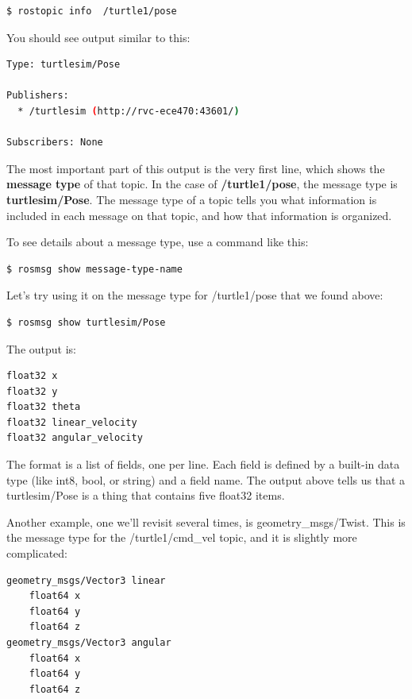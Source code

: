 \begin{enumerate}
\begin{lstlisting}[language=bash]
$ rostopic info  /turtle1/pose
\end{lstlisting}

	You should see output similar to this:

\begin{lstlisting}[language=bash]
Type: turtlesim/Pose

Publishers:
  * /turtlesim (http://rvc-ece470:43601/)

Subscribers: None

\end{lstlisting}

	The most important part of this output is the very first line, which shows the \textbf{message type} of that topic. In the case of \textbf{/turtle1/pose}, the message type is 
	\textbf{turtlesim/Pose}. The message type of a topic tells you what information is included in each message on that topic, and how that information is organized.

	To see details about a message type, use a command like this:

\begin{lstlisting}[language=bash]
$ rosmsg show message-type-name
\end{lstlisting}

	Let's try using it on the message type for /turtle1/pose that we found above:

\begin{lstlisting}[language=bash]
$ rosmsg show turtlesim/Pose
\end{lstlisting}
	
	The output is:

\begin{lstlisting}[language=bash]
float32 x
float32 y
float32 theta
float32 linear_velocity
float32 angular_velocity
\end{lstlisting}

	The format is a list of fields, one per line. Each field is defined by a built-in data type (like int8, bool, or string) and a field name.
	The output above tells us that a turtlesim/Pose is a thing that contains five float32 items.

	Another example, one we'll revisit several times, is geometry\_{}msgs/Twist. This is the message type for the /turtle1/cmd\_{}vel topic, and it is slightly more complicated:

\begin{lstlisting}[language=bash]
geometry_msgs/Vector3 linear
	float64 x
	float64 y
	float64 z
geometry_msgs/Vector3 angular
	float64 x
	float64 y
	float64 z
\end{lstlisting}


\end{enumerate}
